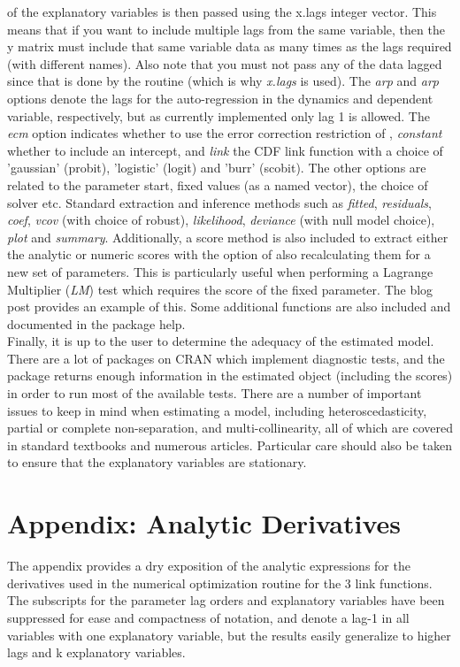of the explanatory variables is then passed using the x.lags integer vector. This means that if you want to include multiple lags from the same
variable, then the y matrix must include that same variable data as many times as the lags required (with different names). Also note that you must
not pass any of the data lagged since that is done by the routine (which is why \emph{x.lags} is used). The \emph{arp} and \emph{arp} options denote
the lags for the auto-regression in the dynamics and dependent variable, respectively, but as currently implemented only lag 1 is allowed. The \emph{ecm}
option indicates whether to use the error correction restriction of \cite{Nyberg2011}, \emph{constant} whether to include an intercept, and \emph{link}
the CDF link function with a choice of 'gaussian' (probit), 'logistic' (logit) and 'burr' (scobit). The other options are related to the parameter start,
fixed values (as a named vector), the choice of solver etc. Standard extraction and inference methods such as \emph{fitted}, \emph{residuals}, 
\emph{coef}, \emph{vcov} (with choice of robust), \emph{likelihood}, \emph{deviance} (with null model choice), \emph{plot} and \emph{summary}. Additionally,
a score method is also included to extract either the analytic or numeric scores with the option of also recalculating them for a new set of parameters.
This is particularly useful when performing a Lagrange Multiplier (\emph{LM}) test which requires the score of the fixed parameter. The blog post provides
an example of this. Some additional functions are also included and documented in the package help.\\
Finally, it is up to the user to determine the adequacy of the estimated model. There are a lot of packages on CRAN which implement diagnostic tests, and
the \verb@dbm@ package returns enough information in the estimated object (including the scores) in order to run most of the available tests. There are a
number of important issues to keep in mind when estimating a model, including heteroscedasticity, partial or complete non-separation, and
multi-collinearity, all of which are covered in standard textbooks and numerous articles. Particular care should also be taken to ensure that
the explanatory variables are stationary.
\section{Appendix: Analytic Derivatives}\label{sec:Appendix}
The appendix provides a dry exposition of the analytic expressions for the derivatives used in the numerical
optimization routine for the 3 link functions. The subscripts for the parameter lag orders and explanatory
variables have been suppressed for ease and compactness of notation, and denote a lag-1 in all variables with
one explanatory variable, but the results easily generalize to higher lags and k explanatory variables.

